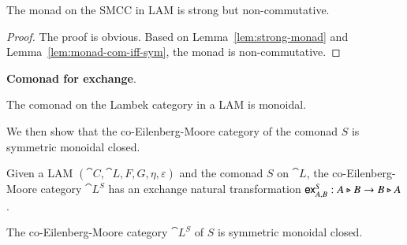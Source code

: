 \begin{theorem}
  The monad on the SMCC in LAM is strong but non-commutative.
\end{theorem}
\begin{proof}
  The proof is obvious. Based on Lemma~\ref{lem:strong-monad} and
  Lemma~\ref{lem:monad-com-iff-sym}, the monad is non-commutative. 
\end{proof}

\textbf{Comonad for exchange}.

\begin{lemma}
  The comonad on the Lambek category in a LAM is monoidal.
\end{lemma}

We then show that the co-Eilenberg-Moore category of the comonad $S$ is symmetric monoidal
closed.


\begin{lemma}
  \label{lem:em-exchange}
  Given a LAM $(\cat{C},\cat{L},F,G,\eta,\varepsilon)$ and the comonad $S$ on $\cat{L}$,
  the co-Eilenberg-Moore category $\cat{L}^S$ has an exchange natural transformation
  $\mathsf{ex}_{A,B}^S:A\triangleright B\rightarrow B\triangleright A$.
\end{lemma}

\begin{theorem}
  The co-Eilenberg-Moore category $\cat{L}^S$ of $S$ is symmetric monoidal closed.
\end{theorem}

